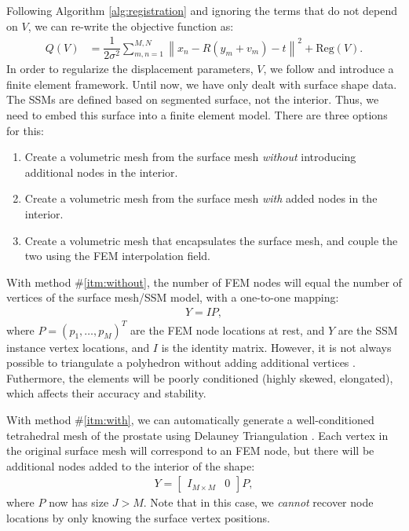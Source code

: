 \documentclass[10pt]{article}
\begin{document}
Following Algorithm \ref{alg:registration} and ignoring the terms that do not depend on $V$, we
can re-write the objective function as:
\begin{align}
  Q(V) & = \dfrac{1}{2\sigma^2}\sum_{m,n=1}^{M,N}\left\|x_n - R\left(y_m+v_m\right)-t\right\|^2 + \mathrm{Reg}(V).
\end{align}
In order to regularize the displacement parameters, $V$, we follow \cite{marami:2011:femreg} and introduce a finite element framework.
Until now, we have only dealt with surface shape data.  The SSMs are defined based on segmented surface, not the interior.  Thus, 
we need to embed this surface into a finite element model.  There are three options for this:
\begin{enumerate}
 \item Create a volumetric mesh from the surface mesh \emph{without} introducing additional nodes in the interior. \label{itm:without}
 \item Create a volumetric mesh from the surface mesh \emph{with} added nodes in the interior.  \label{itm:with}
 \item Create a volumetric mesh that encapsulates the surface mesh, and couple the two using the FEM interpolation field. \label{itm:embedded}
\end{enumerate}
With method \#\ref{itm:without}, the number of FEM nodes will equal the number of vertices of the surface mesh/SSM model, with a one-to-one mapping:
\begin{align}
  Y = I P,
\end{align}
where $P=(p_1,\ldots,p_M)^T$ are the FEM node locations at rest, and $Y$ are the SSM instance vertex locations, and $I$ is the identity matrix.  
However, it is not always possible to triangulate a polyhedron without adding additional vertices \cite{schonhardt:1928:tet,toussaint:1993:tetrahedralization}.  
Futhermore, the elements will be poorly conditioned (highly skewed, elongated), which affects their accuracy and stability.

With method \#\ref{itm:with}, we can automatically generate a well-conditioned tetrahedral mesh of the prostate using Delauney Triangulation 
\cite{si:2008:tetgen}. Each vertex in the original surface mesh will correspond to an FEM node, but there will be additional nodes
added to the interior of the shape:
\begin{align}
  Y = \begin{bmatrix}
	I_{M\times M} & 0
      \end{bmatrix} P,
\end{align}
where $P$ now has size $J>M$.  Note that in this case, we \emph{cannot} recover node locations by only knowing the surface vertex positions.
\end{document}
